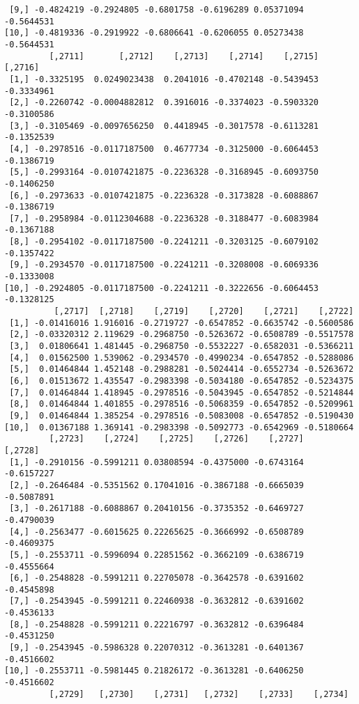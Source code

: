 \documentclass[
  letterpaper,
  DIV=11,
  numbers=noendperiod]{scrreprt}
\begin{document}
\begin{verbatim}
 [9,] -0.4824219 -0.2924805 -0.6801758 -0.6196289 0.05371094 -0.5644531
[10,] -0.4819336 -0.2919922 -0.6806641 -0.6206055 0.05273438 -0.5644531
         [,2711]       [,2712]    [,2713]    [,2714]    [,2715]    [,2716]
 [1,] -0.3325195  0.0249023438  0.2041016 -0.4702148 -0.5439453 -0.3334961
 [2,] -0.2260742 -0.0004882812  0.3916016 -0.3374023 -0.5903320 -0.3100586
 [3,] -0.3105469 -0.0097656250  0.4418945 -0.3017578 -0.6113281 -0.1352539
 [4,] -0.2978516 -0.0117187500  0.4677734 -0.3125000 -0.6064453 -0.1386719
 [5,] -0.2993164 -0.0107421875 -0.2236328 -0.3168945 -0.6093750 -0.1406250
 [6,] -0.2973633 -0.0107421875 -0.2236328 -0.3173828 -0.6088867 -0.1386719
 [7,] -0.2958984 -0.0112304688 -0.2236328 -0.3188477 -0.6083984 -0.1367188
 [8,] -0.2954102 -0.0117187500 -0.2241211 -0.3203125 -0.6079102 -0.1357422
 [9,] -0.2934570 -0.0117187500 -0.2241211 -0.3208008 -0.6069336 -0.1333008
[10,] -0.2924805 -0.0117187500 -0.2241211 -0.3222656 -0.6064453 -0.1328125
          [,2717]  [,2718]    [,2719]    [,2720]    [,2721]    [,2722]
 [1,] -0.01416016 1.916016 -0.2719727 -0.6547852 -0.6635742 -0.5600586
 [2,] -0.03320312 2.119629 -0.2968750 -0.5263672 -0.6508789 -0.5517578
 [3,]  0.01806641 1.481445 -0.2968750 -0.5532227 -0.6582031 -0.5366211
 [4,]  0.01562500 1.539062 -0.2934570 -0.4990234 -0.6547852 -0.5288086
 [5,]  0.01464844 1.452148 -0.2988281 -0.5024414 -0.6552734 -0.5263672
 [6,]  0.01513672 1.435547 -0.2983398 -0.5034180 -0.6547852 -0.5234375
 [7,]  0.01464844 1.418945 -0.2978516 -0.5043945 -0.6547852 -0.5214844
 [8,]  0.01464844 1.401855 -0.2978516 -0.5068359 -0.6547852 -0.5209961
 [9,]  0.01464844 1.385254 -0.2978516 -0.5083008 -0.6547852 -0.5190430
[10,]  0.01367188 1.369141 -0.2983398 -0.5092773 -0.6542969 -0.5180664
         [,2723]    [,2724]    [,2725]    [,2726]    [,2727]    [,2728]
 [1,] -0.2910156 -0.5991211 0.03808594 -0.4375000 -0.6743164 -0.6157227
 [2,] -0.2646484 -0.5351562 0.17041016 -0.3867188 -0.6665039 -0.5087891
 [3,] -0.2617188 -0.6088867 0.20410156 -0.3735352 -0.6469727 -0.4790039
 [4,] -0.2563477 -0.6015625 0.22265625 -0.3666992 -0.6508789 -0.4609375
 [5,] -0.2553711 -0.5996094 0.22851562 -0.3662109 -0.6386719 -0.4555664
 [6,] -0.2548828 -0.5991211 0.22705078 -0.3642578 -0.6391602 -0.4545898
 [7,] -0.2543945 -0.5991211 0.22460938 -0.3632812 -0.6391602 -0.4536133
 [8,] -0.2548828 -0.5991211 0.22216797 -0.3632812 -0.6396484 -0.4531250
 [9,] -0.2543945 -0.5986328 0.22070312 -0.3613281 -0.6401367 -0.4516602
[10,] -0.2553711 -0.5981445 0.21826172 -0.3613281 -0.6406250 -0.4516602
         [,2729]   [,2730]    [,2731]   [,2732]    [,2733]    [,2734]

\end{verbatim}
\end{document}
